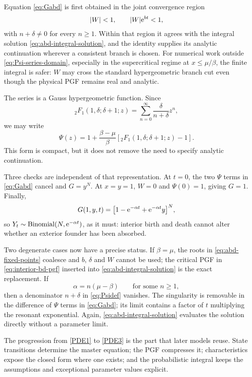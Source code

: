 Equation \eqref{eq:Gabd} is first obtained in the joint convergence region
\begin{equation}
  |W|<1,
  \qquad
  |W|\mathrm{e}^{bt}<1,
  \label{eq:Psi-series-domain}
\end{equation}
with \(n+\delta\neq0\) for every \(n\geq1\).  Within that region it agrees with
the integral solution \eqref{eq:abd-integral-solution}, and the identity supplies
its analytic continuation wherever a consistent branch is chosen.  For numerical
work outside \eqref{eq:Psi-series-domain}, especially in the supercritical regime
at \(x\leq\mu/\beta\), the finite integral is safer: \(W\) may cross the standard
hypergeometric branch cut even though the physical PGF remains real and analytic.

The series is a Gauss hypergeometric function.  Since
\begin{equation}
  {}_2F_1(1,\delta;\delta+1;z)
  =\sum_{n=0}^{\infty}\frac{\delta}{n+\delta}z^n,
  \label{eq:2F1simple}
\end{equation}
we may write
\begin{equation}
  \Psi(z)
  =1+\frac{\beta-\mu}{\beta}
  \left[{}_2F_1(1,\delta;\delta+1;z)-1\right].
  \label{eq:Psihyp}
\end{equation}
This form is compact, but it does not remove the need to specify analytic
continuation.

Three checks are independent of that representation.  At \(t=0\), the two
\(\Psi\) terms in \eqref{eq:Gabd} cancel and \(G=y^N\).  At \(x=y=1\),
\(W=0\) and \(\Psi(0)=1\), giving \(G=1\).  Finally,
\begin{equation}
  G(1,y,t)=
  \bigl[1-\mathrm{e}^{-\alpha t}+\mathrm{e}^{-\alpha t}y\bigr]^N,
  \label{eq:abd-exterior-marginal}
\end{equation}
so \(Y_t\sim\operatorname{Binomial}(N,\mathrm{e}^{-\alpha t})\), as it must: interior
birth and death cannot alter whether an exterior founder has been absorbed.

Two degenerate cases now have a precise status.  If \(\beta=\mu\), the roots in
\eqref{eq:abd-fixed-points} coalesce and \(b\), \(\delta\) and \(W\) cannot be used;
the critical PGF in \eqref{eq:interior-bd-pgf} inserted into
\eqref{eq:abd-integral-solution} is the exact replacement.  If
\begin{equation}
  \alpha=n(\mu-\beta)
  \qquad\text{for some }n\geq1,
  \label{eq:abd-resonance}
\end{equation}
then a denominator \(n+\delta\) in \eqref{eq:Psidef} vanishes.  The singularity
is removable in the difference of \(\Psi\) terms in \eqref{eq:Gabd}; its limit
contains a factor of \(t\) multiplying the resonant exponential.  Again,
\eqref{eq:abd-integral-solution} evaluates the solution directly without a
parameter limit.

The progression from \eqref{PDE1} to \eqref{PDE3} is the part that later models
reuse.  State transitions determine the master equation; the PGF compresses it;
characteristics expose the closed form where one exists; and the probabilistic
integral keeps the assumptions and exceptional parameter values explicit.

\FloatBarrier
